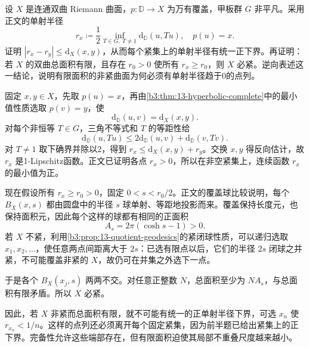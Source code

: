 \begin{exercise}[单射半径的变化与有限面积]\label{b3:ex:13-7}
设 \(X\) 是连通双曲 Riemann 曲面，\(p:\mathbb D\rightarrow X\) 为万有覆盖，甲板群 \(G\) 非平凡。采用正文的单射半径
\[
 r_x\coloneqq\frac12\inf_{T\in G,\ T\ne1}
 \mathrm d_{\mathbb D}(u,Tu),\quad p(u)=x.
\]
证明 \(|r_x-r_y|\le\mathrm d_X(x,y)\)，从而每个紧集上的单射半径有统一正下界。再证明：若 \(X\) 的双曲总面积有限，且存在 \(r_0>0\) 使所有 \(r_x\ge r_0\)，则 \(X\) 必紧。逆向表述这一结论，说明有限面积的非紧曲面为何必须有单射半径趋于0的点列。
\end{exercise}
\begin{solution}
固定 \(x,y\in X\)，先取 \(p(u)=x\)，再由\cref{b3:thm:13-hyperbolic-complete}中的最小值性质选取 \(p(v)=y\)，使
\[
 \mathrm d_{\mathbb D}(u,v)=\mathrm d_X(x,y).
\]
对每个非恒等 \(T\in G\)，三角不等式和 \(T\) 的等距性给
\[
 \mathrm d_{\mathbb D}(u,Tu)
 \le2\mathrm d_{\mathbb D}(u,v)+\mathrm d_{\mathbb D}(v,Tv).
\]
对 \(T\ne1\) 取下确界并除以2，得到 \(r_x\le\mathrm d_X(x,y)+r_y\)。交换 \(x,y\) 得反向估计，故 \(r_x\) 是1-Lipschitz函数。正文已证明各点 \(r_x>0\)，所以在非空紧集上，连续函数 \(r_x\) 的最小值为正。

现在假设所有 \(r_x\ge r_0>0\)，固定 \(0<s<r_0/2\)。正文的覆盖球比较说明，每个 \(B_X(x,s)\) 都由圆盘中的半径 \(s\) 球单射、等距地投影而来。覆盖保持长度元，也保持面积元，因此每个这样的球都有相同的正面积
\[
 A_s=2\pi(\cosh s-1)>0.
\]
若 \(X\) 不紧，利用\cref{b3:prop:13-quotient-geodesics}的紧闭球性质，可以递归选取 \(x_1,x_2,\ldots\)，使任意两点间距离大于 \(2s\)：已选有限点以后，它们的半径 \(2s\) 闭球之并紧，不可能覆盖非紧的 \(X\)，故仍可在并集之外选下一点。

于是各个 \(B_X(x_j,s)\) 两两不交。对任意正整数 \(N\)，总面积至少为 \(NA_s\)，与总面积有限矛盾。所以 \(X\) 必紧。

因此，若 \(X\) 非紧而总面积有限，就不可能有统一的正单射半径下界，可选 \(x_n\) 使 \(r_{x_n}<1/n\)。这样的点列还必须离开每个固定紧集，因为前半题已给出紧集上的正下界。完备性允许这些端部存在，但有限面积迫使其局部不重叠尺度越来越小。
\end{solution}

